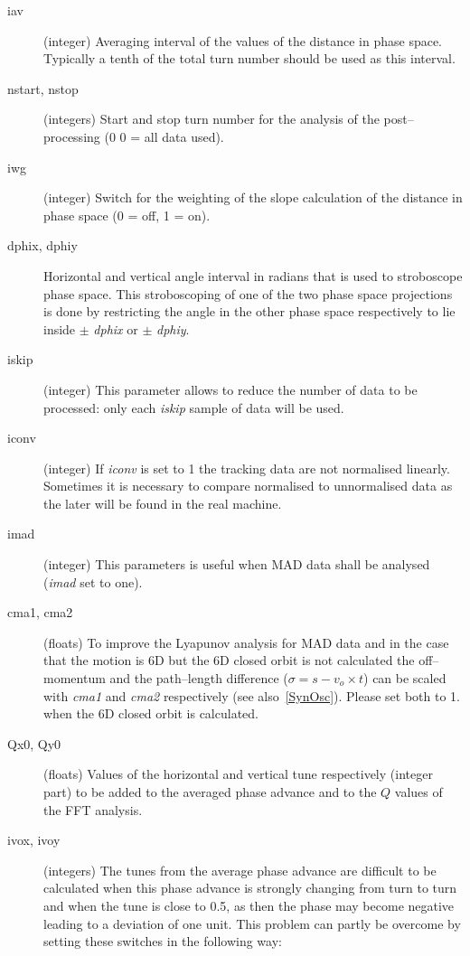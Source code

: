 \begin{description}
\item [iav] (integer) Averaging interval of the values of the distance
  in phase space. Typically a tenth of the total turn number should be
  used as this interval.
\item [nstart, nstop] (integers) Start and stop turn number for the
  analysis of the post--processing (0 0 = all data used).
\item [iwg] (integer) Switch for the weighting of the slope
  calculation of the distance in phase space (0 = off, 1 = on).
\item [dphix, dphiy] Horizontal and vertical angle interval in radians
  that is used to stroboscope phase space. This stroboscoping of one
  of the two phase space projections is done by restricting the angle
  in the other phase space respectively to lie inside $\pm$ {\em
    dphix} \/or $\pm$ {\em dphiy}.
\item [iskip] (integer) This parameter allows to reduce the number of
  data to be processed: only each {\em iskip} \/sample of data will be
  used.
\item [iconv] (integer) If {\em iconv} \/is set to 1 the tracking data
  are not normalised linearly. Sometimes it is necessary to compare
  normalised to unnormalised data as the later will be found in the
  real machine.
\item [imad] (integer) This parameters is useful when MAD data shall
  be analysed ({\em imad} \/set to one).
\item [cma1, cma2] (floats) To improve the Lyapunov analysis for MAD
  data and in the case that the motion is 6D but the 6D closed orbit
  is not calculated the off--momentum and the path--length difference
  ($\sigma = s - v_o \times t$) can be scaled with {\em cma1} \/and
  {\em cma2} \/respectively (see also~\ref{SynOsc}). Please set both
  to 1.  when the 6D closed orbit is calculated.
\item [Qx0, Qy0] (floats) Values of the horizontal and vertical tune
  respectively (integer part) to be added to the averaged phase
  advance and to the $Q$ values of the FFT analysis.
\item [ivox, ivoy] (integers) The tunes from the average phase advance
  are difficult to be calculated when this phase advance is strongly
  changing from turn to turn and when the tune is close to 0.5, as
  then the phase may become negative leading to a deviation of one
  unit. This problem can partly be overcome by setting these switches
  in the following way:

\end{description}
